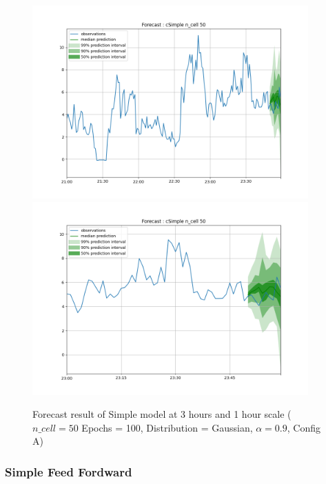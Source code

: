 \begin{figure}[H]
    \centering
    \includegraphics[width=400px]{plots/forecast/a/cSimple/n_cell/50/180.png}
    \includegraphics[width=400px]{plots/forecast/a/cSimple/n_cell/50/60.png}
    \caption{Forecast result of Simple model at 3 hours and 1 hour scale ($n\_cell = 50$ Epochs = 100, Distribution = Gaussian, $\alpha = 0.9$, Config A)}
    \label{fig:simple}
\end{figure}


\subsubsection{Simple Feed Fordward} \label{comp_feedfordward}


